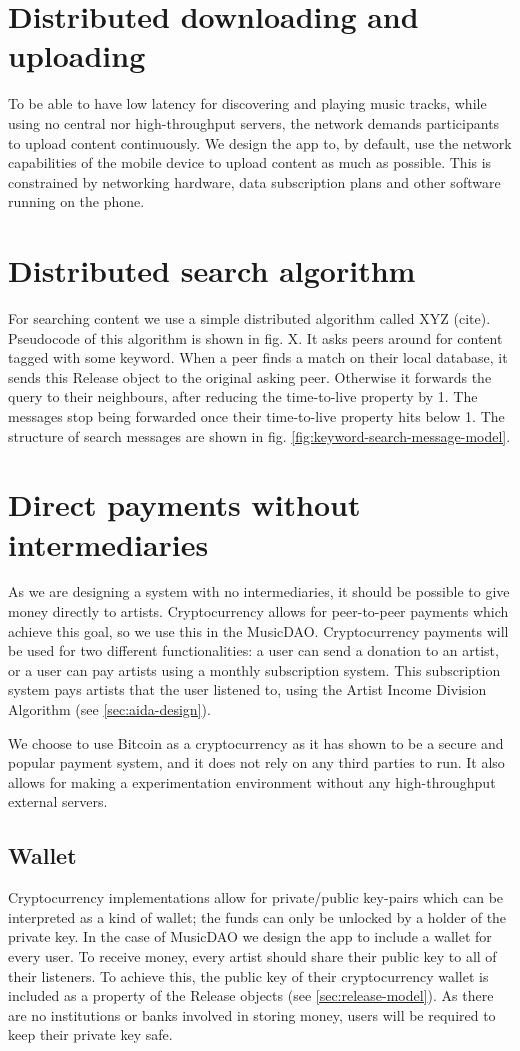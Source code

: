 \section{Distributed downloading and uploading}
To be able to have low latency for discovering and playing music tracks, while using no central nor high-throughput servers, the network demands participants to upload content continuously. We design the app to, by default, use the network capabilities of the mobile device to upload content as much as possible. This is constrained by networking hardware, data subscription plans and other software running on the phone.

\section{Distributed search algorithm}
For searching content we use a simple distributed algorithm called XYZ (cite). Pseudocode of this algorithm is shown in fig. X. It asks peers around for content tagged with some keyword. When a peer finds a match on their local database, it sends this Release object to the original asking peer. Otherwise it forwards the query to their neighbours, after reducing the time-to-live property by 1. The messages stop being forwarded once their time-to-live property hits below 1. The structure of search messages are shown in fig. \ref{fig:keyword-search-message-model}.

\section{Direct payments without intermediaries}
As we are designing a system with no intermediaries, it should be possible to give money directly to artists. Cryptocurrency allows for peer-to-peer payments which achieve this goal, so we use this in the MusicDAO. Cryptocurrency payments will be used for two different functionalities: a user can send a donation to an artist, or a user can pay artists using a monthly subscription system. This subscription system pays artists that the user listened to, using the Artist Income Division Algorithm (see \ref{sec:aida-design}).

We choose to use Bitcoin as a cryptocurrency as it has shown to be a secure and popular payment system, and it does not rely on any third parties to run. It also allows for making a experimentation environment without any high-throughput external servers. 

\subsection{Wallet}
Cryptocurrency implementations allow for private/public key-pairs which can be interpreted as a kind of wallet; the funds can only be unlocked by a holder of the private key. In the case of MusicDAO we design the app to include a wallet for every user. To receive money, every artist should share their public key to all of their listeners. To achieve this, the public key of their cryptocurrency wallet is included as a property of the Release objects (see \ref{sec:release-model}). As there are no institutions or banks involved in storing money, users will be required to keep their private key safe.

